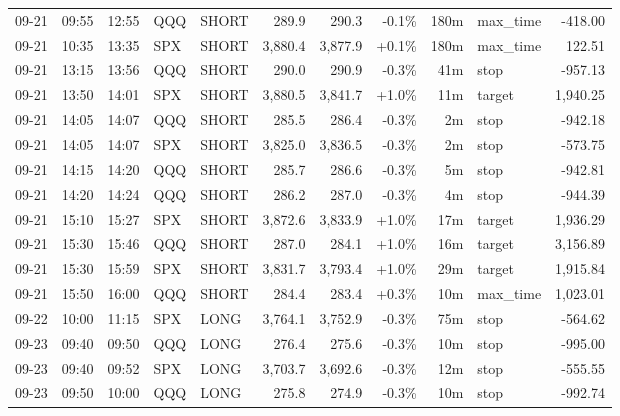 \documentclass[11pt,a4paper,twoside]{article}
\begin{document}
\begin{center}
\begin{longtable}{>{\color{txtmain}}l l l l l r r r r >{\color{txtmain}}l r}
09-21 & 09:55 & 12:55 & QQQ & SHORT & 289.9 & 290.3 & \textcolor{lossred}{-0.1\%} & 180m & max\_time & \textcolor{lossred}{-418.00} \\
09-21 & 10:35 & 13:35 & SPX & SHORT & 3,880.4 & 3,877.9 & \textcolor{wingreen}{+0.1\%} & 180m & max\_time & \textcolor{wingreen}{122.51} \\
09-21 & 13:15 & 13:56 & QQQ & SHORT & 290.0 & 290.9 & \textcolor{lossred}{-0.3\%} & 41m & stop & \textcolor{lossred}{-957.13} \\
09-21 & 13:50 & 14:01 & SPX & SHORT & 3,880.5 & 3,841.7 & \textcolor{wingreen}{+1.0\%} & 11m & target & \textcolor{wingreen}{1,940.25} \\
09-21 & 14:05 & 14:07 & QQQ & SHORT & 285.5 & 286.4 & \textcolor{lossred}{-0.3\%} & 2m & stop & \textcolor{lossred}{-942.18} \\
09-21 & 14:05 & 14:07 & SPX & SHORT & 3,825.0 & 3,836.5 & \textcolor{lossred}{-0.3\%} & 2m & stop & \textcolor{lossred}{-573.75} \\
09-21 & 14:15 & 14:20 & QQQ & SHORT & 285.7 & 286.6 & \textcolor{lossred}{-0.3\%} & 5m & stop & \textcolor{lossred}{-942.81} \\
09-21 & 14:20 & 14:24 & QQQ & SHORT & 286.2 & 287.0 & \textcolor{lossred}{-0.3\%} & 4m & stop & \textcolor{lossred}{-944.39} \\
09-21 & 15:10 & 15:27 & SPX & SHORT & 3,872.6 & 3,833.9 & \textcolor{wingreen}{+1.0\%} & 17m & target & \textcolor{wingreen}{1,936.29} \\
09-21 & 15:30 & 15:46 & QQQ & SHORT & 287.0 & 284.1 & \textcolor{wingreen}{+1.0\%} & 16m & target & \textcolor{wingreen}{3,156.89} \\
09-21 & 15:30 & 15:59 & SPX & SHORT & 3,831.7 & 3,793.4 & \textcolor{wingreen}{+1.0\%} & 29m & target & \textcolor{wingreen}{1,915.84} \\
09-21 & 15:50 & 16:00 & QQQ & SHORT & 284.4 & 283.4 & \textcolor{wingreen}{+0.3\%} & 10m & max\_time & \textcolor{wingreen}{1,023.01} \\
09-22 & 10:00 & 11:15 & SPX & LONG & 3,764.1 & 3,752.9 & \textcolor{lossred}{-0.3\%} & 75m & stop & \textcolor{lossred}{-564.62} \\
09-23 & 09:40 & 09:50 & QQQ & LONG & 276.4 & 275.6 & \textcolor{lossred}{-0.3\%} & 10m & stop & \textcolor{lossred}{-995.00} \\
09-23 & 09:40 & 09:52 & SPX & LONG & 3,703.7 & 3,692.6 & \textcolor{lossred}{-0.3\%} & 12m & stop & \textcolor{lossred}{-555.55} \\
09-23 & 09:50 & 10:00 & QQQ & LONG & 275.8 & 274.9 & \textcolor{lossred}{-0.3\%} & 10m & stop & \textcolor{lossred}{-992.74} \\

\end{longtable}
\end{center}
\end{document}
